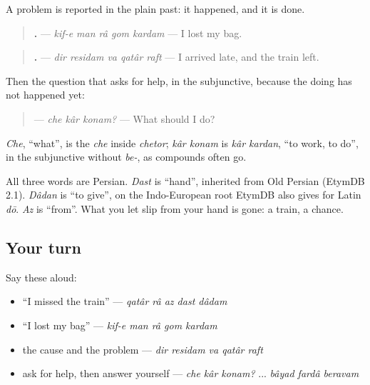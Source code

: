 \begin{grammarlens}[title={Grammar Lens: saying what went wrong}]
A problem is reported in the plain past: it happened, and it is done.

\begin{quote}
\textbf{    .} — \emph{kif-e man râ gom kardam} — I lost my bag.
\end{quote}

\begin{quote}
\textbf{    .} — \emph{dir residam va qatâr raft} — I arrived late, and the train left.
\end{quote}

Then the question that asks for help, in the subjunctive, because the doing has not happened yet:

\begin{quote}
\textbf{  } — \emph{che kâr konam?} — What should I do?
\end{quote}

\emph{Che}, \textquotedblleft{}what\textquotedblright{}, is the \emph{che} inside \emph{chetor}; \emph{kâr konam} is \emph{kâr kardan}, \textquotedblleft{}to work, to do\textquotedblright{}, in the subjunctive without \emph{be-}, as compounds often go.
\end{grammarlens}

\begin{cousinweb}
All three words are Persian. \emph{Dast} is \textquotedblleft{}hand\textquotedblright{}, inherited from Old Persian (EtymDB 2.1). \emph{Dâdan} is \textquotedblleft{}to give\textquotedblright{}, on the Indo-European root EtymDB also gives for Latin \emph{dō}. \emph{Az} is \textquotedblleft{}from\textquotedblright{}. What you let slip from your hand is gone: a train, a chance.
\end{cousinweb}

\subsection*{Your turn}
Say these aloud:

\begin{itemize}
\raggedright
  \item \textquotedblleft{}I missed the train\textquotedblright{} — \emph{qatâr râ az dast dâdam}
  \item \textquotedblleft{}I lost my bag\textquotedblright{} — \emph{kif-e man râ gom kardam}
  \item the cause and the problem — \emph{dir residam va qatâr raft}
  \item ask for help, then answer yourself — \emph{che kâr konam?} ... \emph{bâyad fardâ beravam}
\end{itemize}

